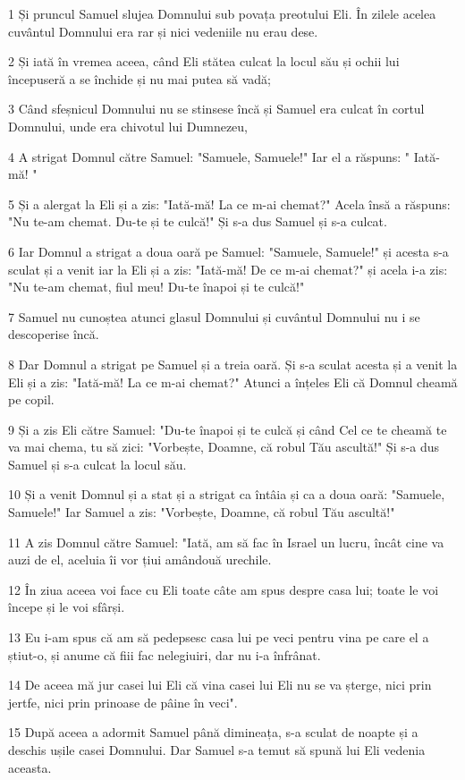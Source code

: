 \par 1 Și pruncul Samuel slujea Domnului sub povața preotului Eli. În zilele acelea cuvântul Domnului era rar și nici vedeniile nu erau dese.
\par 2 Și iată în vremea aceea, când Eli stătea culcat la locul său și ochii lui începuseră a se închide și nu mai putea să vadă;
\par 3 Când sfeșnicul Domnului nu se stinsese încă și Samuel era culcat în cortul Domnului, unde era chivotul lui Dumnezeu,
\par 4 A strigat Domnul către Samuel: "Samuele, Samuele!" Iar el a răspuns: " Iată-mă! "
\par 5 Și a alergat la Eli și a zis: "Iată-mă! La ce m-ai chemat?" Acela însă a răspuns: "Nu te-am chemat. Du-te și te culcă!" Și s-a dus Samuel și s-a culcat.
\par 6 Iar Domnul a strigat a doua oară pe Samuel: "Samuele, Samuele!" și acesta s-a sculat și a venit iar la Eli și a zis: "Iată-mă! De ce m-ai chemat?" și acela i-a zis: "Nu te-am chemat, fiul meu! Du-te înapoi și te culcă!"
\par 7 Samuel nu cunoștea atunci glasul Domnului și cuvântul Domnului nu i se descoperise încă.
\par 8 Dar Domnul a strigat pe Samuel și a treia oară. Și s-a sculat acesta și a venit la Eli și a zis: "Iată-mă! La ce m-ai chemat?" Atunci a înțeles Eli că Domnul cheamă pe copil.
\par 9 Și a zis Eli către Samuel: "Du-te înapoi și te culcă și când Cel ce te cheamă te va mai chema, tu să zici: "Vorbește, Doamne, că robul Tău ascultă!" Și s-a dus Samuel și s-a culcat la locul său.
\par 10 Și a venit Domnul și a stat și a strigat ca întâia și ca a doua oară: "Samuele, Samuele!" Iar Samuel a zis: "Vorbește, Doamne, că robul Tău ascultă!"
\par 11 A zis Domnul către Samuel: "Iată, am să fac în Israel un lucru, încât cine va auzi de el, aceluia îi vor țiui amândouă urechile.
\par 12 În ziua aceea voi face cu Eli toate câte am spus despre casa lui; toate le voi începe și le voi sfârși.
\par 13 Eu i-am spus că am să pedepsesc casa lui pe veci pentru vina pe care el a știut-o, și anume că fiii fac nelegiuiri, dar nu i-a înfrânat.
\par 14 De aceea mă jur casei lui Eli că vina casei lui Eli nu se va șterge, nici prin jertfe, nici prin prinoase de pâine în veci".
\par 15 După aceea a adormit Samuel până dimineața, s-a sculat de noapte și a deschis ușile casei Domnului. Dar Samuel s-a temut să spună lui Eli vedenia aceasta.
